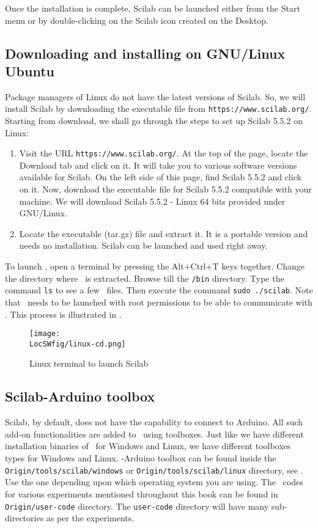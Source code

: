 Once the installation is complete, Scilab can be launched either from the 
Start menu or by double-clicking on the Scilab icon created on the Desktop. 

\subsection{Downloading and installing on GNU/Linux Ubuntu}\label{scilab-installation-linux}

Package managers of Linux do not have the latest versions of Scilab. 
So, we will install Scilab by downloading the executable file 
from {\tt https://www.scilab.org/}. Starting from download, we shall go 
through the steps to set up Scilab 5.5.2 on Linux: 

\begin{enumerate}
      \item Visit the URL {\tt https://www.scilab.org/}. At the top of the page, 
      locate the Download tab and click on it. It will take you to various 
      software versions available for Scilab. On the left side of this page, 
      find Scilab 5.5.2 and click on it. Now, download the executable file for Scilab 5.5.2 
      compatible with your machine.  We will download Scilab 5.5.2 - Linux 64 bits provided under GNU/Linux.  
      \item Locate the executable (tar.gz) file and extract it. 
      It is a portable version and needs no installation. 
      Scilab can be launched and used right away.
\end{enumerate}

To launch \scilab, open a terminal by pressing the Alt+Ctrl+T keys
together. Change the directory where \scilab\ is extracted. Browse
till the {\tt /bin} directory. Type the command {\tt ls} to see a few
\scilab\ files.  Then execute the command {\tt sudo ./scilab}. Note
that \scilab\ needs to be launched with root permissions to be able to
communicate with \arduino. This process is illustrated in
.
\begin{figure}
      \centering
      \texttt{[image: \\LocSWfig/linux-cd.png]}
      \caption{Linux terminal to launch Scilab}
      \label{linux-cd}
\end{figure}

\subsection{Scilab-Arduino toolbox}
\label{sec:sci-ard-toolbox}
Scilab, by default, does not have the capability to connect to
Arduino. All such add-on functionalities are added to \scilab\ using
toolboxes. Just like we have different installation binaries of
\scilab\ for Windows and Linux, we have different toolboxes types for
Windows and Linux. \scilab-Arduino toolbox can be found inside
the {\tt Origin/tools/scilab/windows} or {\tt Origin/tools/scilab/linux} directory,
see .  Use the one depending upon
which operating system you are using. The \scilab\ codes for various
experiments mentioned throughout this book can be found in {\tt
            Origin/user-code} directory. The {\tt user-code} directory will have
many sub-directories as per the experiments.

